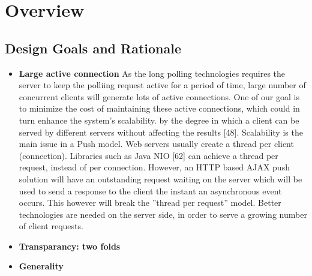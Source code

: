 \section {Overview}
\subsection{Design Goals and Rationale}

\begin{itemize}
\item {\bf Large active connection}  
    As the long polling technologies requires the server to keep the polliing request active for a period of time,
    large number of concurrent clients will generate lots of active connections. One of our goal is to minimize the 
    cost of maintaining these active connections, which could in turn enhance the system's scalability.
     by the degree
    in which a client can be served by different servers without affecting the results [48].
    Scalability is the main issue in a Push model. Web servers usually create a thread per
    client (connection). Libraries such as Java NIO [62] can achieve a thread per request,
    instead of per connection. However, an HTTP based AJAX push solution will have an
    outstanding request waiting on the server which will be used to send a response to the
    client the instant an asynchronous event occurs. This however will break the ”thread
    per request” model. Better technologies are needed on the server side, in order to serve
    a growing number of client requests.
\item {\bf Transparancy: two folds} 
\item {\bf Generality} 
\end{itemize}

